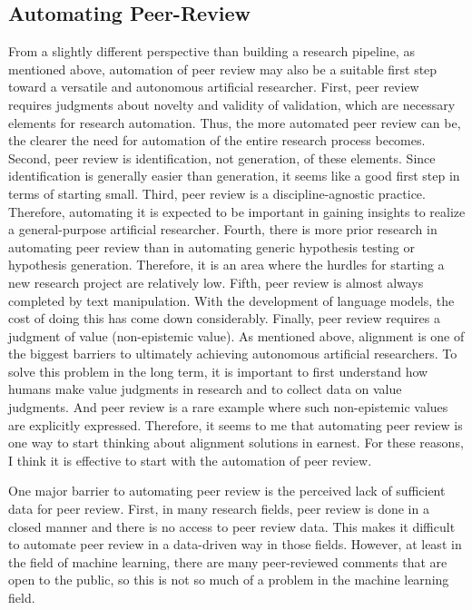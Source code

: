 \subsection{Automating Peer-Review}
From a slightly different perspective than building a research pipeline, as mentioned above, automation of peer review may also be a suitable first step toward a versatile and autonomous artificial researcher. First, peer review requires judgments about novelty and validity of validation, which are necessary elements for research automation. Thus, the more automated peer review can be, the clearer the need for automation of the entire research process becomes. Second, peer review is identification, not generation, of these elements. Since identification is generally easier than generation, it seems like a good first step in terms of starting small. Third, peer review is a discipline-agnostic practice. Therefore, automating it is expected to be important in gaining insights to realize a general-purpose artificial researcher. Fourth, there is more prior research in automating peer review than in automating generic hypothesis testing or hypothesis generation. Therefore, it is an area where the hurdles for starting a new research project are relatively low. Fifth, peer review is almost always completed by text manipulation. With the development of language models, the cost of doing this has come down considerably. Finally, peer review requires a judgment of value (non-epistemic value). As mentioned above, alignment is one of the biggest barriers to ultimately achieving autonomous artificial researchers. To solve this problem in the long term, it is important to first understand how humans make value judgments in research and to collect data on value judgments. And peer review is a rare example where such non-epistemic values are explicitly expressed. Therefore, it seems to me that automating peer review is one way to start thinking about alignment solutions in earnest. For these reasons, I think it is effective to start with the automation of peer review.

One major barrier to automating peer review is the perceived lack of sufficient data for peer review. First, in many research fields, peer review is done in a closed manner and there is no access to peer review data. This makes it difficult to automate peer review in a data-driven way in those fields. However, at least in the field of machine learning, there are many peer-reviewed comments that are open to the public, so this is not so much of a problem in the machine learning field.


